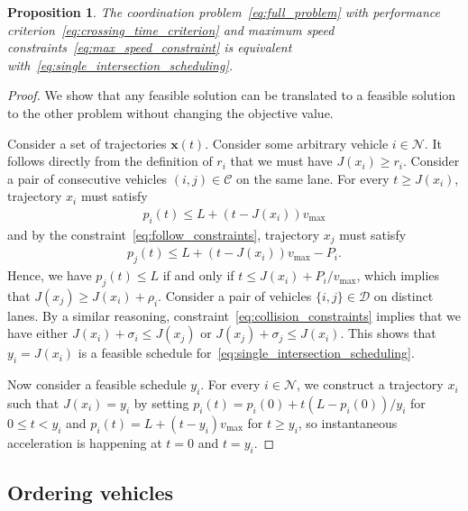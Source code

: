 \documentclass[a4paper]{article}
\theoremstyle{definition}
\theoremstyle{plain}
\newtheorem{proposition}{Proposition}
\begin{document}
\begin{proposition}
  The coordination problem~\eqref{eq:full_problem} with performance criterion~\eqref{eq:crossing_time_criterion} and maximum speed
  constraints~\eqref{eq:max_speed_constraint} is equivalent with~\eqref{eq:single_intersection_scheduling}.
\end{proposition}
\begin{proof}
  We show that any feasible solution can be translated to a feasible solution to
  the other problem without changing the objective value.

  Consider a set of trajectories $\mathbf{x}(t)$. Consider some arbitrary
  vehicle $i \in \mathcal{N}$. It follows directly from the definition of $r_{i}$
  that we must have $J(x_{i}) \geq r_{i}$.
  Consider a pair of consecutive vehicles $(i,j) \in \mathcal{C}$ on the same
  lane. For every $t \geq J(x_{i})$, trajectory $x_{i}$ must satisfy
  \begin{align*}
    p_{i}(t) \leq L + (t - J(x_{i})) v_{\text{max}}
  \end{align*}
  and by the constraint~\eqref{eq:follow_constraints}, trajectory $x_{j}$ must satisfy
  \begin{align*}
    p_{j}(t) \leq L + (t - J(x_{i})) v_{\text{max}} - P_{i} .
  \end{align*}
  Hence, we have $p_{j}(t) \leq L$ if and only if
  $t \leq J(x_{i}) + P_{i} / v_{\text{max}}$, which implies that
  $J(x_{j}) \geq J(x_{i}) + \rho_{i}$.
  Consider a pair of vehicles $\{i, j\} \in \mathcal{D}$ on distinct lanes. By a
  similar reasoning, constraint~\eqref{eq:collision_constraints} implies that we have either
  $J(x_{i}) + \sigma_{i} \leq J(x_{j})$ or $J(x_{j}) + \sigma_{j} \leq J(x_{i})$.
  This shows that $y_{i} = J(x_{i})$ is a feasible schedule for~\eqref{eq:single_intersection_scheduling}.

  Now consider a feasible schedule $y_{i}$. For every $i \in \mathcal{N}$, we
  construct a trajectory $x_{i}$ such that $J(x_{i}) = y_{i}$ by setting
  $p_{i}(t) = p_{i}(0) + t (L - p_{i}(0)) / y_{i}$ for $0 \leq t < y_{i}$ and
  $p_{i}(t) = L + (t - y_{i}) v_{\text{max}}$ for $t \geq y_{i}$, so
  instantaneous acceleration is happening at $t=0$ and $t=y_{i}$.
\end{proof}


\subsection*{Ordering vehicles}
\end{document}
